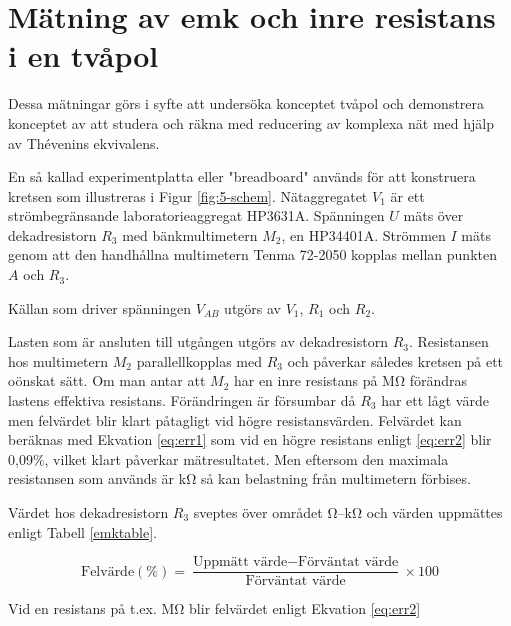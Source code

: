 \documentclass[11pt,a4paper]{article}
\begin{document}
\section{Mätning av emk och inre resistans i en tvåpol}\label{measure_emk}
Dessa mätningar görs i syfte att undersöka konceptet tvåpol och demonstrera
konceptet av att studera och räkna med reducering av komplexa nät med hjälp av
Thévenins ekvivalens.  \par En så kallad experimentplatta eller "breadboard"
används för att konstruera kretsen som illustreras i Figur \ref{fig:5-schem}.
Nätaggregatet $V_{1}$ är ett strömbegränsande laboratorieaggregat HP3631A.
Spänningen $U$ mäts över dekadresistorn $R_{3}$ med bänkmultimetern $M_{2}$, en
HP34401A.  Strömmen $I$ mäts genom att den handhållna multimetern Tenma 72-2050
kopplas mellan punkten $A$ och $R_{3}$.  \par Källan som driver spänningen
$V_{AB}$ utgörs av $V_{1}$, $R_{1}$ och $R_{2}$.  \par Lasten som är ansluten
till utgången utgörs av dekadresistorn $R_{3}$.  Resistansen hos multimetern
$M_{2}$ parallellkopplas med $R_{3}$ och påverkar således kretsen på ett
oönskat sätt. Om man antar att $M_{2}$ har en inre resistans på
\unit[10]{\si{\Mohm}} förändras lastens effektiva resistans. Förändringen är
försumbar då $R_{3}$ har ett lågt värde men felvärdet blir klart påtagligt vid
högre resistansvärden.  Felvärdet kan beräknas med Ekvation \ref{eq:err1} som
vid en högre resistans enligt \ref{eq:err2} blir 0,09\%, vilket klart påverkar
mätresultatet.  Men eftersom den maximala resistansen som används är
\unit[100]{\si{\kohm}} så kan belastning från multimetern förbises.
\par Värdet hos dekadresistorn $R_{3}$ sveptes över området 
\unit[500]{\si{\ohm}}--\unit[100]{\si{\kohm}} och värden uppmättes enligt 
Tabell \ref{emktable}.


\begin{equation}\label{eq:err1}
\text{Felvärde}(\si{\percent}) = 
\frac{\text{Uppmätt värde} - \text{Förväntat värde}}{\text{Förväntat värde}} \times 100
\end{equation}

Vid en resistans på t.ex. \unit[10]{\si{\Mohm}} blir felvärdet enligt Ekvation \ref{eq:err2}
\end{document}
